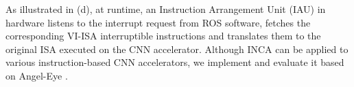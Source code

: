 As illustrated in (d), at runtime, an Instruction Arrangement Unit (IAU) in hardware listens to the interrupt request from ROS software, fetches the corresponding VI-ISA interruptible instructions and translates them to the original ISA executed on the CNN accelerator. 
Although INCA can be applied to various instruction-based CNN accelerators, we implement and evaluate it based on Angel-Eye \cite{guo2017angel}.


